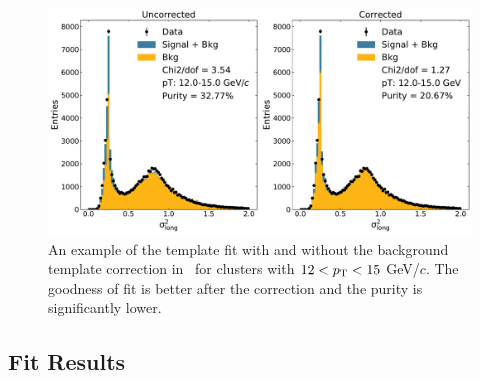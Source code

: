
\begin{figure}
    \centering
    \includegraphics[width=0.5\textheight]{Data_Analysis/Purity/correction-example-p-Pb-cluster_Lambda-12-15.pdf}
    \caption{An example of the template fit with and without the background template correction in \pPb~for clusters with $12 < p_{\mathrm{T}} < 15$ GeV/$c$. The goodness of fit is better after the correction and the purity is significantly lower.}
    \label{fig:purcorrectionexample}
\end{figure}
\FloatBarrier

\subsection{Fit Results}
\label{sec:fitresults}


